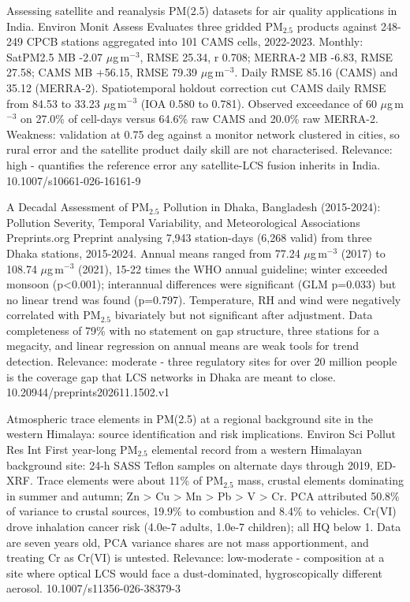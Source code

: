 \documentclass[10pt]{article}
\begin{document}
{Assessing satellite and reanalysis PM(2.5) datasets for air quality applications in India.}
{Environ Monit Assess}
{Evaluates three gridded PM$_{2.5}$ products against 248-249 CPCB stations aggregated into 101 CAMS cells, 2022-2023. Monthly: SatPM2.5 MB -2.07 $\mu$g\,m$^{-3}$, RMSE 25.34, r 0.708; MERRA-2 MB -6.83, RMSE 27.58; CAMS MB +56.15, RMSE 79.39 $\mu$g\,m$^{-3}$. Daily RMSE 85.16 (CAMS) and 35.12 (MERRA-2). Spatiotemporal holdout correction cut CAMS daily RMSE from 84.53 to 33.23 $\mu$g\,m$^{-3}$ (IOA 0.580 to 0.781). Observed exceedance of 60 $\mu$g\,m$^{-3}$ on 27.0\% of cell-days versus 64.6\% raw CAMS and 20.0\% raw MERRA-2. Weakness: validation at 0.75 deg against a monitor network clustered in cities, so rural error and the satellite product daily skill are not characterised. Relevance: high - quantifies the reference error any satellite-LCS fusion inherits in India.}
{10.1007/s10661-026-16161-9}

{A Decadal Assessment of PM$_{2.5}$ Pollution in Dhaka, Bangladesh (2015-2024): Pollution Severity, Temporal Variability, and Meteorological Associations}
{Preprints.org}
{Preprint analysing 7,943 station-days (6,268 valid) from three Dhaka stations, 2015-2024. Annual means ranged from 77.24 $\mu$g\,m$^{-3}$ (2017) to 108.74 $\mu$g\,m$^{-3}$ (2021), 15-22 times the WHO annual guideline; winter exceeded monsoon (p<0.001); interannual differences were significant (GLM p=0.033) but no linear trend was found (p=0.797). Temperature, RH and wind were negatively correlated with PM$_{2.5}$ bivariately but not significant after adjustment. Data completeness of 79\% with no statement on gap structure, three stations for a megacity, and linear regression on annual means are weak tools for trend detection. Relevance: moderate - three regulatory sites for over 20 million people is the coverage gap that LCS networks in Dhaka are meant to close.}
{10.20944/preprints202611.1502.v1}

{Atmospheric trace elements in PM(2.5) at a regional background site in the western Himalaya: source identification and risk implications.}
{Environ Sci Pollut Res Int}
{First year-long PM$_{2.5}$ elemental record from a western Himalayan background site: 24-h SASS Teflon samples on alternate days through 2019, ED-XRF. Trace elements were about 11\% of PM$_{2.5}$ mass, crustal elements dominating in summer and autumn; Zn > Cu > Mn > Pb > V > Cr. PCA attributed 50.8\% of variance to crustal sources, 19.9\% to combustion and 8.4\% to vehicles. Cr(VI) drove inhalation cancer risk (4.0e-7 adults, 1.0e-7 children); all HQ below 1. Data are seven years old, PCA variance shares are not mass apportionment, and treating Cr as Cr(VI) is untested. Relevance: low-moderate - composition at a site where optical LCS would face a dust-dominated, hygroscopically different aerosol.}
{10.1007/s11356-026-38379-3}
\end{document}
